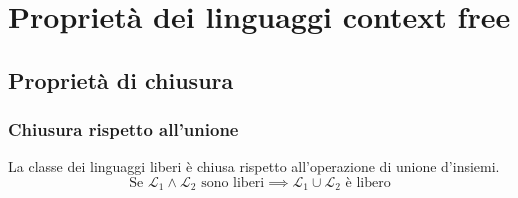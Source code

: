 \documentclass[class=book, crop=false, oneside, 12pt]{standalone}
\begin{document}
\chapter{Proprietà dei linguaggi context free}

\section{Proprietà di chiusura}

\subsection*{Chiusura rispetto all'unione}
\begin{lemma}
  La classe dei linguaggi liberi è chiusa rispetto all'operazione di unione d'insiemi.
  \begin{equation*}
    \textrm{Se } \mathcal{L}_1 \land \mathcal{L}_2 \textrm{ sono liberi} \implies \mathcal{L}_1 \cup \mathcal{L}_2 \textrm{ è libero}
  \end{equation*}
\end{lemma}
\end{document}
